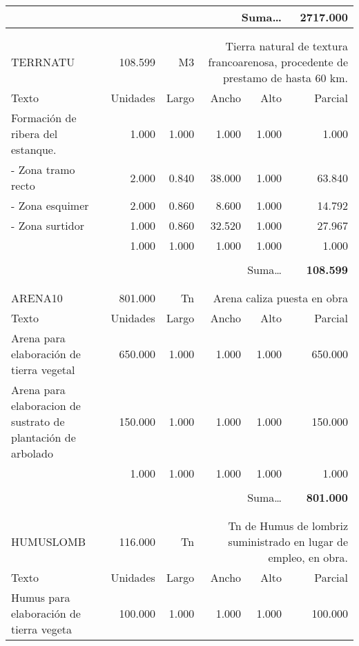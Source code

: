 \documentclass{book}%
\begin{document}
\begin{longtable}{lrrrrr}
\multicolumn{5}{r}{Suma\ldots}&\textbf{2717.000}\\%
\hline%
&&&&&\\%
&&&&&\\%
TERRNATU&108.599& M3&\multicolumn{3}{p{6cm}}{\scriptsize Tierra natural de textura francoarenosa, procedente de prestamo de hasta 60 km.\normalsize}\\%
Texto&Unidades&Largo&Ancho&Alto&Parcial\\%
\hline%
\multicolumn{1}{p{3.5cm}}{Formación de ribera del estanque.}&1.000&1.000&1.000&1.000&1.000\\%
\multicolumn{1}{p{3.5cm}}{{-} Zona tramo recto}&2.000&0.840&38.000&1.000&63.840\\%
\multicolumn{1}{p{3.5cm}}{{-} Zona esquimer}&2.000&0.860&8.600&1.000&14.792\\%
\multicolumn{1}{p{3.5cm}}{{-} Zona surtidor}&1.000&0.860&32.520&1.000&27.967\\%
\multicolumn{1}{p{3.5cm}}{}&1.000&1.000&1.000&1.000&1.000\\%
&&&&&\\%
\multicolumn{5}{r}{Suma\ldots}&\textbf{108.599}\\%
\hline%
&&&&&\\%
&&&&&\\%
ARENA10&801.000& Tn&\multicolumn{3}{p{6cm}}{\scriptsize Arena caliza puesta en obra\normalsize}\\%
Texto&Unidades&Largo&Ancho&Alto&Parcial\\%
\hline%
\multicolumn{1}{p{3.5cm}}{Arena para elaboración de tierra vegetal}&650.000&1.000&1.000&1.000&650.000\\%
\multicolumn{1}{p{3.5cm}}{Arena para elaboracion de sustrato de plantación de arbolado}&150.000&1.000&1.000&1.000&150.000\\%
\multicolumn{1}{p{3.5cm}}{}&1.000&1.000&1.000&1.000&1.000\\%
&&&&&\\%
\multicolumn{5}{r}{Suma\ldots}&\textbf{801.000}\\%
\hline%
&&&&&\\%
&&&&&\\%
HUMUSLOMB&116.000& Tn&\multicolumn{3}{p{6cm}}{\scriptsize Tn de Humus de lombriz suministrado en lugar de empleo, en obra.\normalsize}\\%
Texto&Unidades&Largo&Ancho&Alto&Parcial\\%
\hline%
\multicolumn{1}{p{3.5cm}}{Humus para elaboración de tierra vegeta}&100.000&1.000&1.000&1.000&100.000\\%

\end{longtable}
\end{document}
